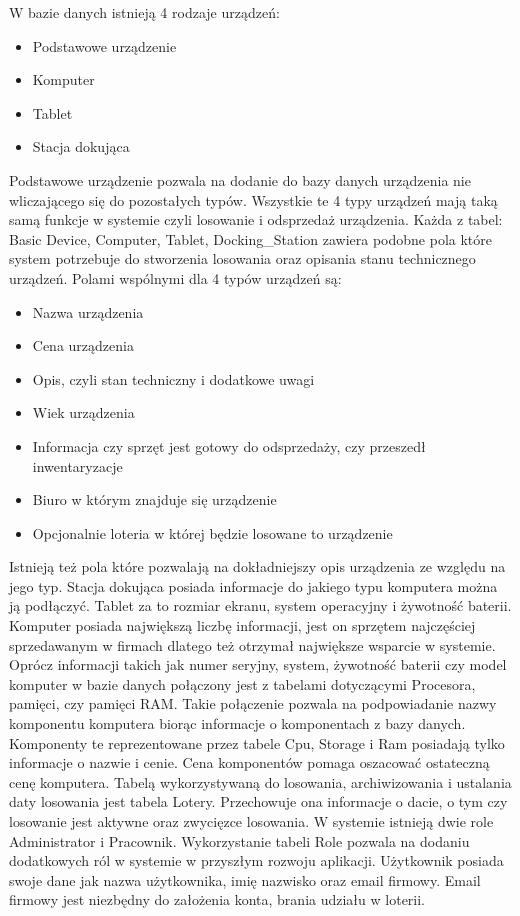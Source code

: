 W bazie danych istnieją 4 rodzaje urządzeń:
\begin{itemize}
	\item Podstawowe urządzenie
	\item Komputer
	\item Tablet
	\item Stacja dokująca
\end{itemize}
Podstawowe urządzenie pozwala na dodanie do bazy danych urządzenia nie wliczającego się do pozostałych typów.
Wszystkie te 4 typy urządzeń mają taką samą funkcje w systemie czyli losowanie i odsprzedaż urządzenia. Każda z tabel: Basic Device, Computer, Tablet, Docking\_Station zawiera podobne pola które system potrzebuje do stworzenia losowania oraz opisania stanu technicznego urządzeń. Polami wspólnymi dla 4 typów urządzeń są:
\begin{itemize}
	\item Nazwa urządzenia
	\item Cena urządzenia
	\item Opis, czyli stan techniczny i dodatkowe uwagi
	\item Wiek urządzenia
	\item Informacja czy sprzęt jest gotowy do odsprzedaży, czy przeszedł inwentaryzacje
	\item Biuro w którym znajduje się urządzenie
	\item Opcjonalnie loteria w której będzie losowane to urządzenie
\end{itemize}

Istnieją też pola które pozwalają na dokładniejszy opis urządzenia ze względu na jego typ. Stacja dokująca posiada informacje do jakiego typu komputera można ją podłączyć. Tablet za to rozmiar ekranu, system operacyjny i żywotność baterii.
 Komputer posiada największą liczbę informacji, jest on sprzętem najczęściej sprzedawanym w firmach dlatego też otrzymał największe wsparcie w systemie. Oprócz informacji takich jak numer seryjny, system, żywotność baterii czy model komputer w bazie danych połączony jest z tabelami dotyczącymi Procesora, pamięci, czy pamięci RAM. Takie połączenie pozwala na podpowiadanie nazwy komponentu komputera biorąc informacje o komponentach z bazy danych. Komponenty te reprezentowane przez tabele Cpu, Storage i Ram posiadają tylko informacje o nazwie i cenie. Cena komponentów pomaga oszacować ostateczną cenę komputera.
Tabelą wykorzystywaną do losowania, archiwizowania i ustalania daty losowania jest tabela Lotery. Przechowuje ona informacje o dacie, o tym czy losowanie jest aktywne oraz zwycięzce losowania.
W systemie istnieją dwie role Administrator i Pracownik. Wykorzystanie tabeli Role pozwala na dodaniu dodatkowych ról w systemie w przyszłym rozwoju aplikacji. Użytkownik posiada swoje dane jak nazwa użytkownika, imię nazwisko oraz email firmowy. Email firmowy jest niezbędny do założenia konta, brania udziału w loterii.